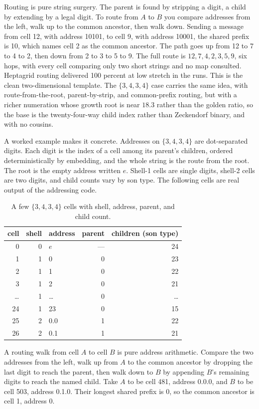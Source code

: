 Routing is pure string surgery. The parent is found by stripping a digit, a child by extending by a legal digit. To route from $A$ to $B$ you compare addresses from the left, walk up to the common ancestor, then walk down. Sending a message from cell 12, with address 10101, to cell 9, with address 10001, the shared prefix is 10, which names cell 2 as the common ancestor. The path goes up from 12 to 7 to 4 to 2, then down from 2 to 3 to 5 to 9. The full route is $12, 7, 4, 2, 3, 5, 9$, six hops, with every cell comparing only two short strings and no map consulted. Heptagrid routing delivered 100 percent at low stretch in the runs. \cite{pollard2026vibetest} This is the clean two-dimensional template. The $\{3,4,3,4\}$ case carries the same idea, with route-from-the-root, parent-by-strip, and common-prefix routing, but with a richer numeration whose growth root is near $18.3$ rather than the golden ratio, so the base is the twenty-four-way child index rather than Zeckendorf binary, and with no cousins.

A worked example makes it concrete. Addresses on $\{3,4,3,4\}$ are dot-separated digits. Each digit is the index of a cell among its parent's children, ordered deterministically by embedding, and the whole string is the route from the root. The root is the empty address written $e$. Shell-1 cells are single digits, shell-2 cells are two digits, and child counts vary by son type. The following cells are real output of the addressing code. \cite{pollard2026vibetest}

\begin{table}[ht]
\centering
\begin{tabular}{@{}rrlrr@{}}
\toprule
cell & shell & address & parent & children (son type) \\
\midrule
0  & 0 & $e$   & --- & 24 \\
1  & 1 & 0   & 0 & 23 \\
2  & 1 & 1   & 0 & 22 \\
3  & 1 & 2   & 0 & 21 \\
\dots & 1 & \dots & 0 & \dots \\
24 & 1 & 23  & 0 & 15 \\
25 & 2 & 0.0 & 1 & 22 \\
26 & 2 & 0.1 & 1 & 21 \\
\bottomrule
\end{tabular}
\caption{A few $\{3,4,3,4\}$ cells with shell, address, parent, and child count.}
\end{table}

A routing walk from cell $A$ to cell $B$ is pure address arithmetic. Compare the two addresses from the left, walk up from $A$ to the common ancestor by dropping the last digit to reach the parent, then walk down to $B$ by appending $B$'s remaining digits to reach the named child. Take $A$ to be cell 481, address 0.0.0, and $B$ to be cell 503, address 0.1.0. Their longest shared prefix is 0, so the common ancestor is cell 1, address 0.

